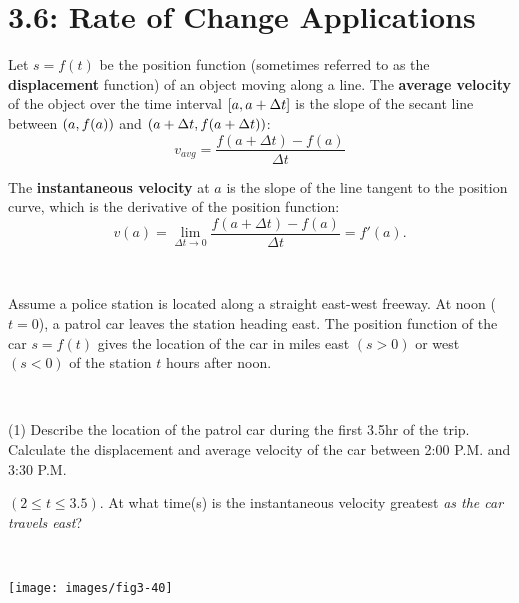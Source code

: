 \documentclass[mathNotesPreamble]{subfiles}
\begin{document}
\section{3.6: Rate of Change Applications}
\begin{defn*}
  Let $s=f(t)$ be the position function (sometimes referred to as the \textbf{displacement} function) of an object moving along a line. The \textbf{average velocity} of the object over the time interval ${\left[a,a+\Delta t\right]}$ is the slope of the secant line between ${\left(a,f(a)\right)}$ and ${\left(a+\Delta t,f(a+\Delta t)\right)}$:
    $$v_{avg}=\frac{f(a+\Delta t)-f(a)}{\Delta t}$$
  
  The \textbf{instantaneous velocity} at $a$ is the slope of the line tangent to the position curve, which is the derivative of the position function:
    $$v(a)=\lim_{\Delta t \to 0} \frac{f(a+\Delta t)-f(a)}{\Delta t}=f'(a).$$
\end{defn*}

\begin{ex*}\ 

\noindent
Assume a police station is located along a straight east-west freeway. At noon ($t=0$), a patrol car leaves the station heading east. The position function of the car $s=f(t)$ gives the location of the car in miles east $(s>0)$ or west $(s<0)$ of the station $t$ hours after noon.
\end{ex*}
\vspace*{-20pt}
\begin{minipage}[t]{0.6\linewidth}\ 

  \begin{tasks}(1)
    \task Describe the location of the patrol car during the first 3.5hr of the trip.
    \task Calculate the displacement and average velocity of the car between 2:00 P.M. and 3:30 P.M. 
    
    $(2\leq t\leq3.5)$.
    \task At what time(s) is the instantaneous velocity greatest \textit{as the car travels east}?
  \end{tasks}
\end{minipage}%
\begin{minipage}[t]{0.4\linewidth}\ 

  \begin{flushright}
    \texttt{[image: images/fig3-40]}
  \end{flushright}
\end{minipage}
\end{document}
